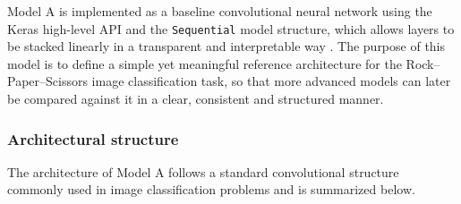 \documentclass[11pt,a4paper]{article}
\begin{document}
Model A is implemented as a baseline convolutional neural network using the Keras high-level API and the \texttt{Sequential} model structure, which allows layers to be stacked linearly in a transparent and interpretable way \cite{keras_models_overview,keras_sequential_model,keras_sequential_guide}. The purpose of this model is to define a simple yet meaningful reference architecture for the Rock--Paper--Scissors image classification task, so that more advanced models can later be compared against it in a clear, consistent and structured manner.

\subsubsection{Architectural structure}

The architecture of Model A follows a standard convolutional structure commonly used in image classification problems and is summarized below.
\end{document}
